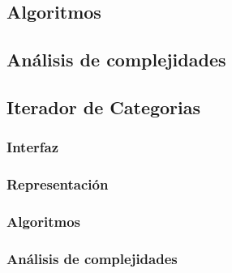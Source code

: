 \documentclass[12pt, a4paper]{article}
\begin{document}
\subsection{Algoritmos}

\subsection{Análisis de complejidades}

\newpage

\subsection{Iterador de Categorias} 
\subsubsection{Interfaz}

\subsubsection{Representaci\'on}

\subsubsection{Algoritmos}

\subsubsection{Análisis de complejidades}

\newpage
\end{document}
